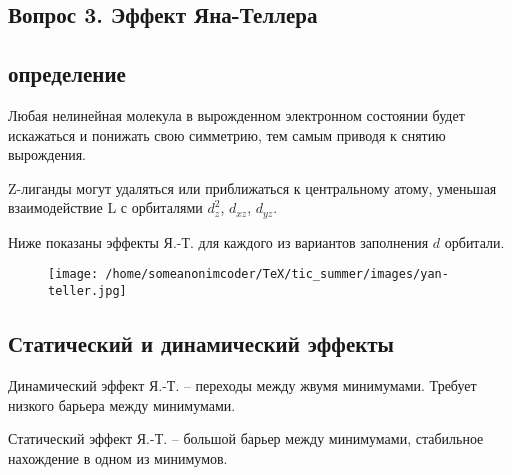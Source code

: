 

\subsection{Вопрос 3. Эффект Яна-Теллера}

\subsection*{определение}
Любая нелинейная молекула в вырожденном электронном состоянии будет искажаться и понижать свою симметрию, тем самым приводя к снятию вырождения.

Z-лиганды могут удаляться или приближаться к центральному атому, уменьшая взаимодействие L с орбиталями $d_z^2$, $d_{xz}$, $d_{yz}$.

Ниже показаны эффекты Я.-Т. для каждого из вариантов заполнения $d$ орбитали.

\begin{figure}[H]
\centering
\texttt{[image: /home/someanonimcoder/TeX/tic\_summer/images/yan-teller.jpg]}
\end{figure}

\subsection*{Статический и динамический эффекты}

Динамический эффект Я.-Т. -- переходы между жвумя минимумами. Требует низкого барьера между минимумами.

Статический эффект Я.-Т. -- большой барьер между минимумами, стабильное нахождение в одном из минимумов.


